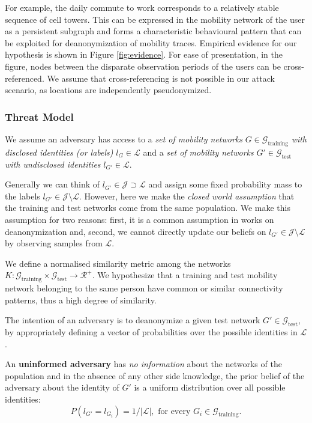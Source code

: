 For example, the daily commute to work corresponds to a relatively stable sequence of cell towers.
This can be expressed in the mobility network of the user as a persistent subgraph and forms a characteristic behavioural pattern that can be exploited for deanonymization of mobility traces.
Empirical evidence for our hypothesis is shown in Figure \ref{fig:evidence}.
For ease of presentation, in the figure, nodes between the disparate observation periods of the users can be cross-referenced. We assume that cross-referencing is not possible in our attack scenario, as locations are independently pseudonymized.

\subsubsection{Threat Model \label{sec:threat-model}}

We assume an adversary has access to a \emph{set of mobility networks} $ G \in \mathcal{G}_{\text{training}} $ \emph{with disclosed identities (or labels)} $l_{G} \in \mathcal{L}$
and a \emph{set of mobility networks} $ G' \in \mathcal{G}_{\text{test}} $ \emph{with undisclosed identities}
$ l_{G'} \in \mathcal{L}$.%

{Generally we can think of $ l_{G'} \in \mathcal{J} \supset \mathcal{L}$ and assign some fixed probability mass to the labels $ l_{G'} \in \mathcal{J} \setminus \mathcal{L}$.
However, here we make the \emph{closed world assumption} that the training and test networks come from the same population.
We make this assumption for two reasons: first, it is a common assumption in works on deanonymization and, second, we cannot directly update our beliefs on $ l_{G'} \in \mathcal{J} \setminus \mathcal{L}$ by observing samples from $ \mathcal{L}$. }

We define a normalised similarity metric among the networks $ K: \mathcal{G}_{\text{training}} \times \mathcal{G}_{\text{test}} \rightarrow \mathcal{R}^+ $.
We hypothesize that a training and test mobility network belonging to the same person have common or similar connectivity patterns, thus a high degree of similarity.

The intention of an adversary is to deanonymize a given test network $ G' \in \mathcal{G}_{\text{test}} $, by appropriately defining a vector of probabilities over the possible identities in $ \mathcal{L}$.

An \textbf{uninformed adversary} has \emph{no information} about the networks of the population and in the absence of any other side knowledge, the prior belief of the adversary about the identity of $ G' $ is a uniform distribution over all possible identities:
\[
	P\left(l_{G'}= l_{G_i}\right) = 1/|\mathcal{L}|, \mbox{ for every }  G_i \in \mathcal{G}_{\text{training}}.
\]

